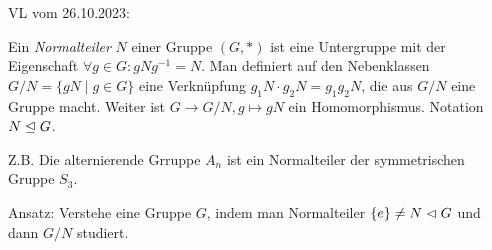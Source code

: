 \documentclass[../main.tex]{subfiles}
\begin{document}
\begin{flushright}
VL vom 26.10.2023:
\end{flushright}
\addtocounter{theorem}{-1}
\begin{reminder}
    Ein \emph{Normalteiler} $N$ einer Gruppe $(G,*)$ ist eine Untergruppe mit der Eigenschaft  $\forall g\in G: gNg^{-1} = N$. Man definiert auf den Nebenklassen $G/N = \{gN\mid g\in G\}$ eine Verknüpfung $g_1N \cdot g_2N = g_1g_2N$, die aus $G/N$ eine Gruppe macht. Weiter ist $G\rightarrow G/N, g\mapsto gN$ ein Homomorphismus. Notation $N\trianglelefteq G$.

    Z.B. Die alternierende Grruppe $A_n$ ist ein Normalteiler der symmetrischen Gruppe $S_3$.

\end{reminder}
Ansatz: Verstehe eine Gruppe $G$, indem man Normalteiler $\{e\} \neq N \vartriangleleft G$ und dann $G/N$ studiert.
\end{document}
